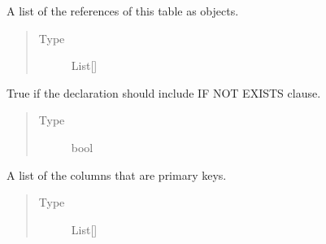 \documentclass[letterpaper,10pt,english]{sphinxmanual}
\begin{document}
\begin{fulllineitems}
\begin{fulllineitems}
\end{fulllineitems}


\begin{fulllineitems}
\label{\detokenize{model:simple_sql.model.table.Table.__references}}
\sphinxAtStartPar
A list of the references of this table as objects.
\begin{quote}\begin{description}
\item[{Type}] \leavevmode
\sphinxAtStartPar
List{[}{\hyperref[\detokenize{model:simple_sql.model.foreign_key.ForeignKey}]{}}{]}

\end{description}\end{quote}

\end{fulllineitems}


\begin{fulllineitems}
\label{\detokenize{model:simple_sql.model.table.Table.__if_not_exists}}
\sphinxAtStartPar
True if the declaration should include IF NOT EXISTS clause.
\begin{quote}\begin{description}
\item[{Type}] \leavevmode
\sphinxAtStartPar
bool

\end{description}\end{quote}

\end{fulllineitems}


\begin{fulllineitems}
\label{\detokenize{model:simple_sql.model.table.Table.__primary_keys}}
\sphinxAtStartPar
A list of the columns that are primary keys.
\begin{quote}\begin{description}
\item[{Type}] \leavevmode
\sphinxAtStartPar
List{[}{\hyperref[\detokenize{model:simple_sql.model.column.Column}]{}}{]}


\end{description}
\end{quote}
\end{fulllineitems}
\end{fulllineitems}
\end{document}
